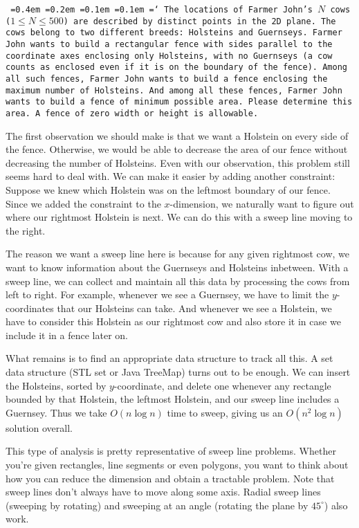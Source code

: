 \texttt{
\font=0.4em%
\font=0.2em%
\font=0.1em%
\font=0.1em%
\hyphenchar\font=`\-%
The locations of Farmer John's $N$ cows ($1 \le N \le 500$) are described by distinct points in the 2D plane. The cows belong to two different breeds: Holsteins and Guernseys. Farmer John wants to build a rectangular fence with sides parallel to the coordinate axes enclosing only Holsteins, with no Guernseys (a cow counts as enclosed even if it is on the boundary of the fence). Among all such fences, Farmer John wants to build a fence enclosing the maximum number of Holsteins. And among all these fences, Farmer John wants to build a fence of minimum possible area. Please determine this area. A fence of zero width or height is allowable.}

The first observation we should make is that we want a Holstein on every side of the fence. Otherwise, we would be able to decrease the area of our fence without decreasing the number of Holsteins. Even with our observation, this problem still seems hard to deal with. We can make it easier by adding another constraint: Suppose we knew which Holstein was on the leftmost boundary of our fence. Since we added the constraint to the $x$-dimension, we naturally want to figure out where our rightmost Holstein is next. We can do this with a sweep line moving to the right.

The reason we want a sweep line here is because for any given rightmost cow, we want to know information about the Guernseys and Holsteins inbetween. With a sweep line, we can collect and maintain all this data by processing the cows from left to right. For example, whenever we see a Guernsey, we have to limit the $y$-coordinates that our Holsteins can take. And whenever we see a Holstein, we have to consider this Holstein as our rightmost cow and also store it in case we include it in a fence later on.

What remains is to find an appropriate data structure to track all this. A set data structure (STL set or Java TreeMap) turns out to be enough. We can insert the Holsteins, sorted by $y$-coordinate, and delete one whenever any rectangle bounded by that Holstein, the leftmost Holstein, and our sweep line includes a Guernsey. Thus we take $O(n \log n)$ time to sweep, giving us an $O(n^2 \log n)$ solution overall.

This type of analysis is pretty representative of sweep line problems. Whether you're given rectangles, line segments or even polygons, you want to think about how you can reduce the dimension and obtain a tractable problem. Note that sweep lines don't always have to move along some axis. Radial sweep lines (sweeping by rotating) and sweeping at an angle (rotating the plane by $45^\circ$) also work. 
